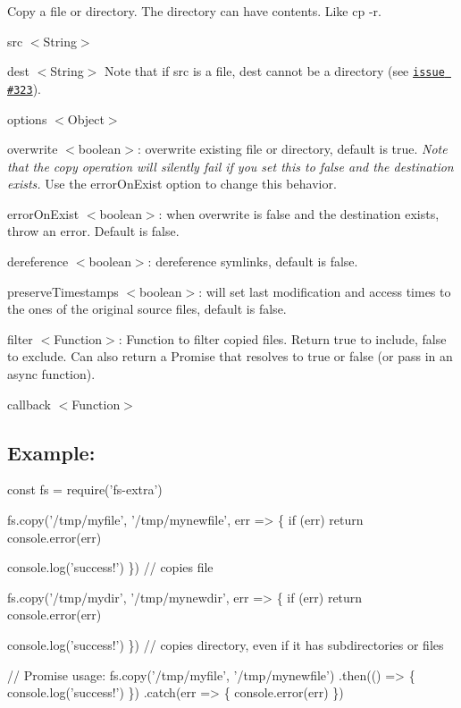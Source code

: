 Copy a file or directory. The directory can have contents. Like {\ttfamily cp -\/r}.


\begin{DoxyItemize}
\item {\ttfamily src} {\ttfamily $<$String$>$}
\item {\ttfamily dest} {\ttfamily $<$String$>$} Note that if {\ttfamily src} is a file, {\ttfamily dest} cannot be a directory (see \href{https://github.com/jprichardson/node-fs-extra/issues/323}{\tt issue \#323}).
\item {\ttfamily options} {\ttfamily $<$Object$>$}
\begin{DoxyItemize}
\item {\ttfamily overwrite} {\ttfamily $<$boolean$>$}\+: overwrite existing file or directory, default is {\ttfamily true}. {\itshape Note that the copy operation will silently fail if you set this to {\ttfamily false} and the destination exists.} Use the {\ttfamily error\+On\+Exist} option to change this behavior.
\item {\ttfamily error\+On\+Exist} {\ttfamily $<$boolean$>$}\+: when {\ttfamily overwrite} is {\ttfamily false} and the destination exists, throw an error. Default is {\ttfamily false}.
\item {\ttfamily dereference} {\ttfamily $<$boolean$>$}\+: dereference symlinks, default is {\ttfamily false}.
\item {\ttfamily preserve\+Timestamps} {\ttfamily $<$boolean$>$}\+: will set last modification and access times to the ones of the original source files, default is {\ttfamily false}.
\item {\ttfamily filter} {\ttfamily $<$Function$>$}\+: Function to filter copied files. Return {\ttfamily true} to include, {\ttfamily false} to exclude. Can also return a {\ttfamily Promise} that resolves to {\ttfamily true} or {\ttfamily false} (or pass in an {\ttfamily async} function).
\end{DoxyItemize}
\item {\ttfamily callback} {\ttfamily $<$Function$>$}
\end{DoxyItemize}

\subsection*{Example\+:}


\begin{DoxyCode}
const fs = require('fs-extra')

fs.copy('/tmp/myfile', '/tmp/mynewfile', err => \{
  if (err) return console.error(err)

  console.log('success!')
\}) // copies file

fs.copy('/tmp/mydir', '/tmp/mynewdir', err => \{
  if (err) return console.error(err)

  console.log('success!')
\}) // copies directory, even if it has subdirectories or files

// Promise usage:
fs.copy('/tmp/myfile', '/tmp/mynewfile')
.then(() => \{
  console.log('success!')
\})
.catch(err => \{
  console.error(err)
\})
\end{DoxyCode}


